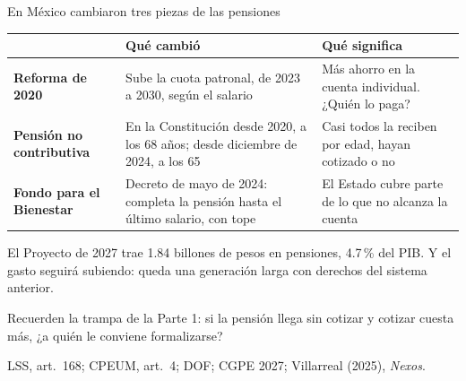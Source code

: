 \documentclass[aspectratio=169,11pt]{beamer}
\newcommand{\fuente}[1]{\par\vfill{\small\color{cGris}#1\par}}
\begin{document}
\begin{frame}{En México cambiaron tres piezas de las pensiones}
  \centering
  \begin{tabular}{@{}>{\raggedright\arraybackslash}p{2.7cm}>{\raggedright\arraybackslash}p{5.3cm}>{\raggedright\arraybackslash}p{4.9cm}@{}}
    \toprule
    & \textbf{Qué cambió} & \textbf{Qué significa} \\
    \midrule
    \textbf{Reforma de 2020} & Sube la cuota patronal, de 2023 a 2030, según el salario & Más ahorro en la cuenta individual. ¿Quién lo paga? \\[0.2em]
    \textbf{Pensión no contributiva} & En la Constitución desde 2020, a los 68 años; desde diciembre de 2024, a los 65 & Casi todos la reciben por edad, hayan cotizado o no \\[0.2em]
    \textbf{Fondo para el Bienestar} & Decreto de mayo de 2024: completa la pensión hasta el último salario, con tope & El Estado cubre parte de lo que no alcanza la cuenta \\
    \bottomrule
  \end{tabular}
  \par\medskip\raggedright
  \pause
  El Proyecto de 2027 trae 1.84 billones de pesos en pensiones, 4.7\,\% del PIB. Y el gasto seguirá subiendo: queda una generación larga con derechos del sistema anterior.
  \pause
  \par\smallskip
  Recuerden la trampa de la Parte 1: si la pensión llega sin cotizar y cotizar cuesta más, ¿a quién le conviene formalizarse?
  \fuente{LSS, art.~168; CPEUM, art.~4; DOF; CGPE 2027; Villarreal (2025), \emph{Nexos}.}
\end{frame}
\end{document}
